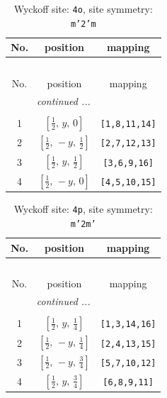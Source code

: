 \documentclass[fleqn,8pt]{jsarticle}
\begin{document}
\renewcommand{\arraystretch}{1.2}
\begin{longtable}{ccc}
\caption{Wyckoff site: {\tt 4o}, site symmetry: {\tt m'2'm}}
 \\
 \hline \hline
No. & position & mapping \\ \hline \endfirsthead

\multicolumn{2}{l}{\tablename\ \thetable{}} \\
 \hline \hline
No. & position & mapping \\ \hline \endhead

 \hline \hline
\multicolumn{2}{r}{\footnotesize\it continued ...} \\ \endfoot

 \hline \hline
\multicolumn{2}{r}{} \\ \endlastfoot

1 & $\left[ \frac{1}{2},\, y,\, 0 \right]$ & {\tt [1,8,11,14]} \\ \hline
2 & $\left[ \frac{1}{2},\, - y,\, \frac{1}{2} \right]$ & {\tt [2,7,12,13]} \\ \hline
3 & $\left[ \frac{1}{2},\, y,\, \frac{1}{2} \right]$ & {\tt [3,6,9,16]} \\ \hline
4 & $\left[ \frac{1}{2},\, - y,\, 0 \right]$ & {\tt [4,5,10,15]} \\
\end{longtable}
\renewcommand{\arraystretch}{1.2}
\begin{longtable}{ccc}
\caption{Wyckoff site: {\tt 4p}, site symmetry: {\tt m'2m'}}
 \\
 \hline \hline
No. & position & mapping \\ \hline \endfirsthead

\multicolumn{2}{l}{\tablename\ \thetable{}} \\
 \hline \hline
No. & position & mapping \\ \hline \endhead

 \hline \hline
\multicolumn{2}{r}{\footnotesize\it continued ...} \\ \endfoot

 \hline \hline
\multicolumn{2}{r}{} \\ \endlastfoot

1 & $\left[ \frac{1}{2},\, y,\, \frac{1}{4} \right]$ & {\tt [1,3,14,16]} \\ \hline
2 & $\left[ \frac{1}{2},\, - y,\, \frac{1}{4} \right]$ & {\tt [2,4,13,15]} \\ \hline
3 & $\left[ \frac{1}{2},\, - y,\, \frac{3}{4} \right]$ & {\tt [5,7,10,12]} \\ \hline
4 & $\left[ \frac{1}{2},\, y,\, \frac{3}{4} \right]$ & {\tt [6,8,9,11]} \\
\end{longtable}
\end{document}
